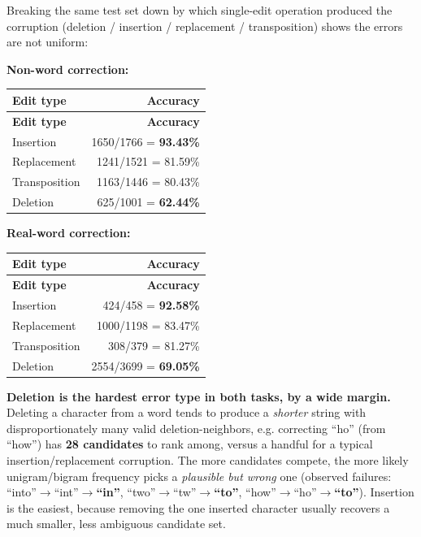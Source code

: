 \documentclass[11pt,a4paper]{article}
\begin{document}
Breaking the same test set down by which single-edit operation produced the corruption (deletion / insertion / replacement / transposition) shows the errors are not uniform:

\textbf{Non-word correction:}

{\small
\setlength{\tabcolsep}{4pt}
\begin{longtable}{lr}
\toprule
\textbf{Edit type} & \textbf{Accuracy} \\
\midrule
\endfirsthead
\toprule
\textbf{Edit type} & \textbf{Accuracy} \\
\midrule
\endhead
Insertion & 1650/1766 = \textbf{93.43\%} \\
Replacement & 1241/1521 = 81.59\% \\
Transposition & 1163/1446 = 80.43\% \\
Deletion & 625/1001 = \textbf{62.44\%} \\
\bottomrule
\end{longtable}}

\textbf{Real-word correction:}

{\small
\setlength{\tabcolsep}{4pt}
\begin{longtable}{lr}
\toprule
\textbf{Edit type} & \textbf{Accuracy} \\
\midrule
\endfirsthead
\toprule
\textbf{Edit type} & \textbf{Accuracy} \\
\midrule
\endhead
Insertion & 424/458 = \textbf{92.58\%} \\
Replacement & 1000/1198 = 83.47\% \\
Transposition & 308/379 = 81.27\% \\
Deletion & 2554/3699 = \textbf{69.05\%} \\
\bottomrule
\end{longtable}}

\textbf{Deletion is the hardest error type in both tasks, by a wide margin.} Deleting a character from a word tends to produce a \textit{shorter} string with disproportionately many valid deletion-neighbors, e.g. correcting ``ho'' (from ``how'') has \textbf{28 candidates} to rank among, versus a handful for a typical insertion/replacement corruption. The more candidates compete, the more likely unigram/bigram frequency picks a \textit{plausible but wrong} one (observed failures: ``into''$\rightarrow$``int''$\rightarrow$\textbf{``in''}, ``two''$\rightarrow$``tw''$\rightarrow$\textbf{``to''}, ``how''$\rightarrow$``ho''$\rightarrow$\textbf{``to''}). Insertion is the easiest, because removing the one inserted character usually recovers a much smaller, less ambiguous candidate set.
\end{document}
